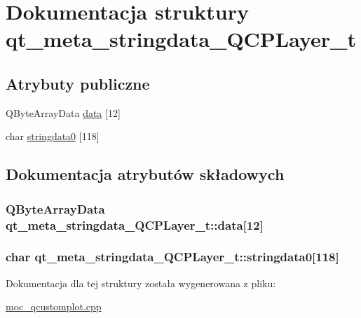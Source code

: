 \hypertarget{structqt__meta__stringdata___q_c_p_layer__t}{}\section{Dokumentacja struktury qt\+\_\+meta\+\_\+stringdata\+\_\+\+Q\+C\+P\+Layer\+\_\+t}
\label{structqt__meta__stringdata___q_c_p_layer__t}
\subsection*{Atrybuty publiczne}
\begin{DoxyCompactItemize}
\item 
Q\+Byte\+Array\+Data \hyperlink{structqt__meta__stringdata___q_c_p_layer__t_a8c36428e0f14ee3bf9fb37ad1719be47}{data} \mbox{[}12\mbox{]}
\item 
char \hyperlink{structqt__meta__stringdata___q_c_p_layer__t_a823b98e98042cc0f3c0c9b73fcd0f226}{stringdata0} \mbox{[}118\mbox{]}
\end{DoxyCompactItemize}


\subsection{Dokumentacja atrybutów składowych}
\subsubsection[{\texorpdfstring{data}{data}}]{\setlength{\rightskip}{0pt plus 5cm}Q\+Byte\+Array\+Data qt\+\_\+meta\+\_\+stringdata\+\_\+\+Q\+C\+P\+Layer\+\_\+t\+::data\mbox{[}12\mbox{]}}\hypertarget{structqt__meta__stringdata___q_c_p_layer__t_a8c36428e0f14ee3bf9fb37ad1719be47}{}\label{structqt__meta__stringdata___q_c_p_layer__t_a8c36428e0f14ee3bf9fb37ad1719be47}
\subsubsection[{\texorpdfstring{stringdata0}{stringdata0}}]{\setlength{\rightskip}{0pt plus 5cm}char qt\+\_\+meta\+\_\+stringdata\+\_\+\+Q\+C\+P\+Layer\+\_\+t\+::stringdata0\mbox{[}118\mbox{]}}\hypertarget{structqt__meta__stringdata___q_c_p_layer__t_a823b98e98042cc0f3c0c9b73fcd0f226}{}\label{structqt__meta__stringdata___q_c_p_layer__t_a823b98e98042cc0f3c0c9b73fcd0f226}


Dokumentacja dla tej struktury została wygenerowana z pliku\+:\begin{DoxyCompactItemize}
\item 
\hyperlink{moc__qcustomplot_8cpp}{moc\+\_\+qcustomplot.\+cpp}\end{DoxyCompactItemize}
